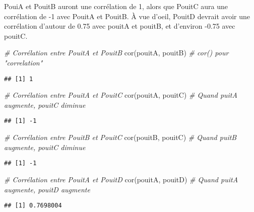 \documentclass[
]{book}
\newenvironment{Shaded}{\begin{snugshade}}{\end{snugshade}}
\newcommand{\CommentTok}[1]{\textcolor[rgb]{0.56,0.35,0.01}{\textit{#1}}}
\newcommand{\FunctionTok}[1]{\textcolor[rgb]{0.00,0.00,0.00}{#1}}
\newcommand{\NormalTok}[1]{#1}
\begin{document}
PouiA et PouitB auront une corrélation de 1, alors que PouitC aura une corrélation de -1 avec PouitA et PouitB. À vue d'oeil, PouitD devrait avoir une corrélation d'autour de 0.75 avec pouitA et pouitB, et d'environ -0.75 avec pouitC.

\begin{Shaded}
\begin{Highlighting}[]
\CommentTok{\# Corrélation entre PouitA et PouitB}
\FunctionTok{cor}\NormalTok{(pouitA, pouitB) }\CommentTok{\# cor() pour "correlation"}
\end{Highlighting}
\end{Shaded}

\begin{verbatim}
## [1] 1
\end{verbatim}

\begin{Shaded}
\begin{Highlighting}[]
\CommentTok{\# Corrélation entre PouitA et PouitC}
\FunctionTok{cor}\NormalTok{(pouitA, pouitC) }\CommentTok{\# Quand puitA augmente, pouitC diminue}
\end{Highlighting}
\end{Shaded}

\begin{verbatim}
## [1] -1
\end{verbatim}

\begin{Shaded}
\begin{Highlighting}[]
\CommentTok{\# Corrélation entre PouitB et PouitC}
\FunctionTok{cor}\NormalTok{(pouitB, pouitC) }\CommentTok{\# Quand puitB augmente, pouitC diminue}
\end{Highlighting}
\end{Shaded}

\begin{verbatim}
## [1] -1
\end{verbatim}

\begin{Shaded}
\begin{Highlighting}[]
\CommentTok{\# Corrélation entre PouitA et PouitD}
\FunctionTok{cor}\NormalTok{(pouitA, pouitD) }\CommentTok{\# Quand puitA augmente, pouitD augmente}
\end{Highlighting}
\end{Shaded}

\begin{verbatim}
## [1] 0.7698004
\end{verbatim}
\end{document}
